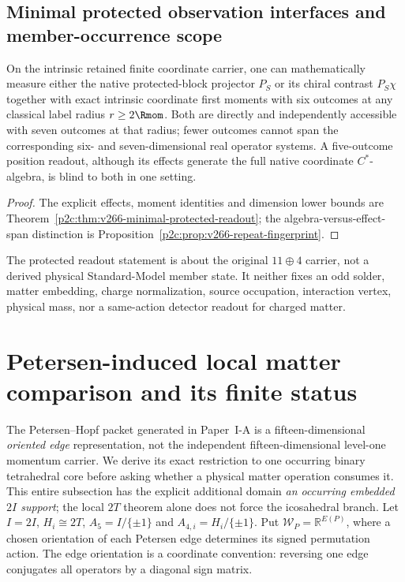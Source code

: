 \documentclass[12pt,a4paper]{article}
\begin{document}
\subsection{Minimal protected observation interfaces and member-occurrence scope}
\label{p5:sec:v266-protected-observation}
\begin{corollary}
\label{p5:cor:v266-protected-observation}
On the intrinsic retained finite coordinate carrier, one can
mathematically measure either the native protected-block projector
$P_S$ or its chiral contrast $P_S\chi$ together with exact intrinsic
coordinate first moments with six outcomes at any classical label
radius $r\ge2\Rmom$. Both are directly and independently accessible
with seven outcomes at that radius; fewer outcomes cannot span the
corresponding six- and seven-dimensional real operator systems.
A five-outcome position readout, although its effects generate the
full native coordinate $C^*$-algebra, is blind to both in one setting.
\end{corollary}
\begin{proof}
The explicit effects, moment identities and dimension lower bounds
are Theorem~\ref{p2c:thm:v266-minimal-protected-readout}; the
algebra-versus-effect-span distinction is
Proposition~\ref{p2c:prop:v266-repeat-fingerprint}.
\end{proof}
The protected readout statement is about the original $11\oplus4$
carrier, not a derived physical Standard-Model member state. It
neither fixes an odd solder, matter embedding, charge normalization,
source occupation, interaction vertex, physical mass, nor a
same-action detector readout for charged matter.


\section{Petersen-induced local matter comparison and its finite status}
\label{p5:sec:v321-petersen-matter}

The Petersen--Hopf packet generated in Paper~I-A is a fifteen-dimensional
\emph{oriented edge} representation, not the independent fifteen-dimensional
level-one momentum carrier. We derive its exact restriction to one occurring
binary tetrahedral core before asking whether a physical matter operation
consumes it. This entire subsection has the explicit additional domain
\emph{an occurring embedded $2I$ support}; the local $2T$ theorem alone
does not force the icosahedral branch. Let $I=2I$, $H_i\cong2T$, $A_5=I/\{\pm1\}$ and
$A_{4,i}=H_i/\{\pm1\}$. Put $\mathscr W_P=\mathbb R^{E(P)}$, where a
chosen orientation of each Petersen edge determines its signed permutation
action. The edge orientation is a coordinate convention: reversing one edge
conjugates all operators by a diagonal sign matrix.
\end{document}
